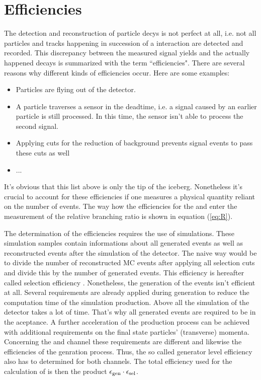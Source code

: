 \chapter{Efficiencies}
\label{sec:Efficiencies}

The detection and reconstruction of particle decys is not perfect at all, i.e. not all particles and tracks happening in succession of a \proton\proton interaction are detected and recorded.
This discrepancy between the measured signal yields and the actually happened decays is summarized with the term ``efficiencies".
There are several reasons why different kinds of efficiencies occur.
Here are some examples:
\begin{itemize}
    \item Particles are flying out of the detector.
    \item A particle traverses a sensor in the deadtime, i.e. a signal caused by an earlier particle is still processed. 
          In this time, the sensor isn't able to process the second signal.
    \item Applying cuts for the reduction of background prevents signal events to pass these cuts as well
    \item ...
\end{itemize}
It's obvious that this list above is only the tip of the iceberg.
Nonetheless it's crucial to account for these efficiencies if one measures a physical quantity reliant on the number of events.
The way how the efficiencies for the \LbToDpmunuX and \LbToLcmunu enter the measurement of the relative branching ratio \R is shown in equation (\ref{eq:R}).

The determination of the efficiencies requires the use of simulations.
These simulation samples contain informations about all generated events as well as reconstructed events after the simulation of the detector. 
The naive way would be to divide the number of reconstructed MC events after applying all selection cuts and divide this by the number of generated events. 
This efficiency is hereafter called selection efficiency \effSel.
Nonetheless, the generation of the events isn't efficient at all. 
Several requirements are already applied during generation to reduce the computation time of the simulation production.
Above all the simulation of the detector takes a lot of time.
That's why all generated events are required to be in the \lhcb aceptance.
A further acceleration of the production process can be achieved with additional requirements on the final state particles' (transverse) momenta.
Concerning the  \LbToDpmunuX and \LbToLcmunu channel these requirements are different and likewise the efficiencies of the genration process.
Thus, the so called generator level efficiency \effGen also has to determined for both channels. 
The total efficiency used for the calculation of \R is then the product $\epsilon_{\text{gen}} \cdot \epsilon_{\text{sel}}$.

